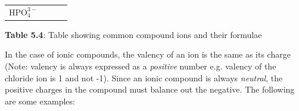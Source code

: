 {\begin{center}
\begin{xtabular*}{\mytablewidth}[t]{|p{10\mystarwidth}|p{10\mystarwidth}|p{10\mystarwidth}|p{10\mystarwidth}|}
        \begin{math}\mathrm{HPO}_{4}^{3-}\end{math}%
     \tabularnewline{}
    \end{xtabular*}
      \end{center}
    \begin{center}{\small\bfseries Table 5.4}: Table showing common compound ions and their formulae\end{center}
    
    \addtocounter{footnote}{-0}
    
        }%
      
    \par
  
        \label{m38689*id144609}In the case of ionic compounds, the valency of an ion is the same as its charge (Note: valency is always expressed as a
\textsl{positive} number e.g. valency of the chloride ion is 1 and not -1). Since an ionic compound is always \textsl{neutral},
the positive charges in the compound must balance out the negative. The following are some examples:\par 
\label{m38689*secfhsst!!!underscore!!!id768}\vspace{.5cm} 
      
